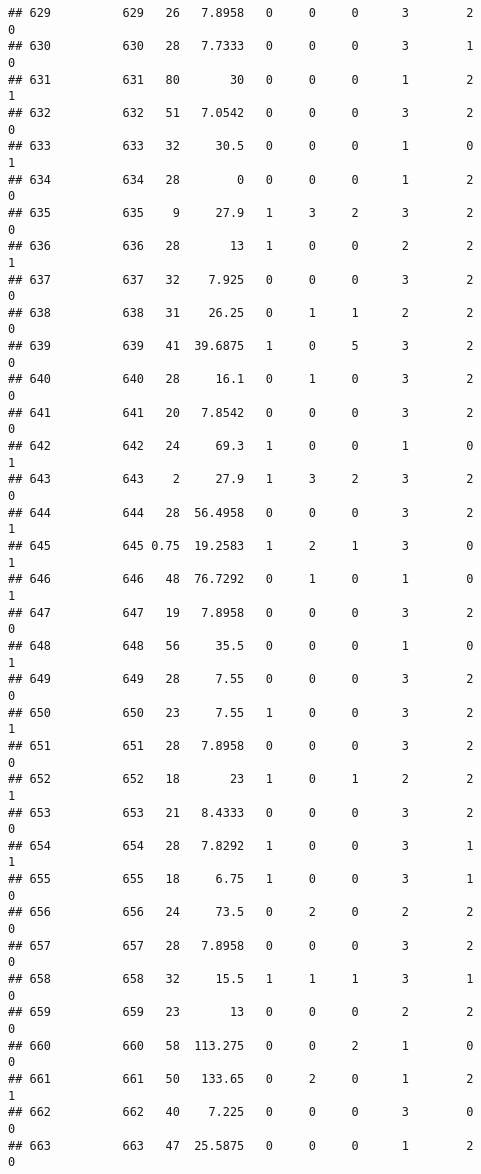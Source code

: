 \documentclass[
]{article}
\begin{document}
\begin{verbatim}
## 629          629   26   7.8958   0     0     0      3        2         0
## 630          630   28   7.7333   0     0     0      3        1         0
## 631          631   80       30   0     0     0      1        2         1
## 632          632   51   7.0542   0     0     0      3        2         0
## 633          633   32     30.5   0     0     0      1        0         1
## 634          634   28        0   0     0     0      1        2         0
## 635          635    9     27.9   1     3     2      3        2         0
## 636          636   28       13   1     0     0      2        2         1
## 637          637   32    7.925   0     0     0      3        2         0
## 638          638   31    26.25   0     1     1      2        2         0
## 639          639   41  39.6875   1     0     5      3        2         0
## 640          640   28     16.1   0     1     0      3        2         0
## 641          641   20   7.8542   0     0     0      3        2         0
## 642          642   24     69.3   1     0     0      1        0         1
## 643          643    2     27.9   1     3     2      3        2         0
## 644          644   28  56.4958   0     0     0      3        2         1
## 645          645 0.75  19.2583   1     2     1      3        0         1
## 646          646   48  76.7292   0     1     0      1        0         1
## 647          647   19   7.8958   0     0     0      3        2         0
## 648          648   56     35.5   0     0     0      1        0         1
## 649          649   28     7.55   0     0     0      3        2         0
## 650          650   23     7.55   1     0     0      3        2         1
## 651          651   28   7.8958   0     0     0      3        2         0
## 652          652   18       23   1     0     1      2        2         1
## 653          653   21   8.4333   0     0     0      3        2         0
## 654          654   28   7.8292   1     0     0      3        1         1
## 655          655   18     6.75   1     0     0      3        1         0
## 656          656   24     73.5   0     2     0      2        2         0
## 657          657   28   7.8958   0     0     0      3        2         0
## 658          658   32     15.5   1     1     1      3        1         0
## 659          659   23       13   0     0     0      2        2         0
## 660          660   58  113.275   0     0     2      1        0         0
## 661          661   50   133.65   0     2     0      1        2         1
## 662          662   40    7.225   0     0     0      3        0         0
## 663          663   47  25.5875   0     0     0      1        2         0

\end{verbatim}
\end{document}
